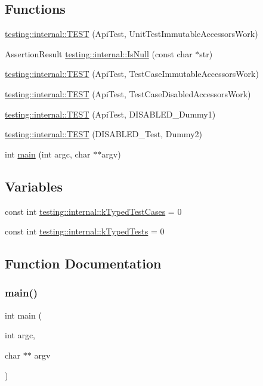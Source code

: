 \subsection*{Functions}
\begin{DoxyCompactItemize}
\item 
\mbox{\hyperlink{namespacetesting_1_1internal_a9ac879683abb06d1c0bba3a339ea2f40}{testing\+::internal\+::\+T\+E\+ST}} (Api\+Test, Unit\+Test\+Immutable\+Accessors\+Work)
\item 
Assertion\+Result \mbox{\hyperlink{namespacetesting_1_1internal_adcfd37a66bc4cb0e8291cf46e1a6c72b}{testing\+::internal\+::\+Is\+Null}} (const char $\ast$str)
\item 
\mbox{\hyperlink{namespacetesting_1_1internal_a33809333fe5b5f33c2bd56ddcdd1dbb6}{testing\+::internal\+::\+T\+E\+ST}} (Api\+Test, Test\+Case\+Immutable\+Accessors\+Work)
\item 
\mbox{\hyperlink{namespacetesting_1_1internal_a459d693357db8f8f48c26a8bee3ffb84}{testing\+::internal\+::\+T\+E\+ST}} (Api\+Test, Test\+Case\+Disabled\+Accessors\+Work)
\item 
\mbox{\hyperlink{namespacetesting_1_1internal_a9ed5f89c92532506899e3908e79af4de}{testing\+::internal\+::\+T\+E\+ST}} (Api\+Test, D\+I\+S\+A\+B\+L\+E\+D\+\_\+\+Dummy1)
\item 
\mbox{\hyperlink{namespacetesting_1_1internal_a4a84433419426d1c1b87ce998267b0d4}{testing\+::internal\+::\+T\+E\+ST}} (D\+I\+S\+A\+B\+L\+E\+D\+\_\+\+Test, Dummy2)
\item 
int \mbox{\hyperlink{gtest-unittest-api__test_8cc_a3c04138a5bfe5d72780bb7e82a18e627}{main}} (int argc, char $\ast$$\ast$argv)
\end{DoxyCompactItemize}
\subsection*{Variables}
\begin{DoxyCompactItemize}
\item 
const int \mbox{\hyperlink{namespacetesting_1_1internal_a685ea5332074ae63b0ded2b184ac2271}{testing\+::internal\+::k\+Typed\+Test\+Cases}} = 0
\item 
const int \mbox{\hyperlink{namespacetesting_1_1internal_a53ee2d113744f9ba1d89469db4d7388b}{testing\+::internal\+::k\+Typed\+Tests}} = 0
\end{DoxyCompactItemize}


\subsection{Function Documentation}
\mbox{\label{gtest-unittest-api__test_8cc_a3c04138a5bfe5d72780bb7e82a18e627}} 
\subsubsection{\texorpdfstring{main()}{main()}}
{\footnotesize\ttfamily int main (\begin{DoxyParamCaption}\item[{int}]{argc,  }\item[{char $\ast$$\ast$}]{argv }\end{DoxyParamCaption})}

